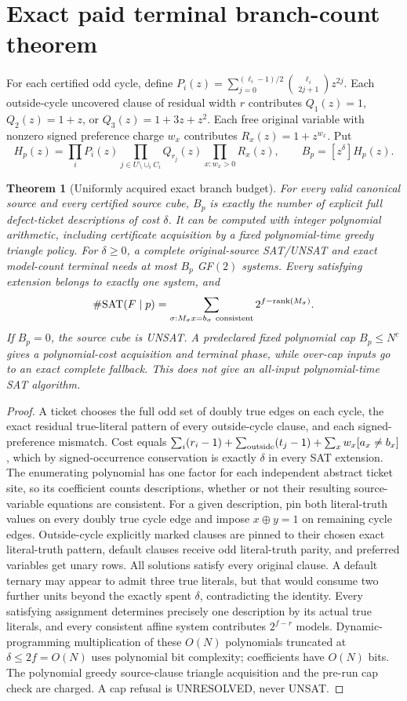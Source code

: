 \documentclass[11pt]{article}
\newtheorem{theorem}{Theorem}
\begin{document}
\section{Exact paid terminal branch-count theorem}
For each certified odd cycle, define $P_i(z)=\sum_{j=0}^{(\ell_i-1)/2}\binom{\ell_i}{2j+1}z^{2j}$. Each outside-cycle uncovered clause of residual width $r$ contributes $Q_1(z)=1$, $Q_2(z)=1+z$, or $Q_3(z)=1+3z+z^2$. Each free original variable with nonzero signed preference charge $w_x$ contributes $R_x(z)=1+z^{w_x}$. Put
\[
H_p(z)=\prod_iP_i(z)\prod_{j\in U\setminus\cup_i C_i}Q_{r_j}(z)
\prod_{x:w_x>0}R_x(z),\qquad
B_p=[z^\delta]H_p(z).
\]
\begin{theorem}[Uniformly acquired exact branch budget]
For every valid canonical source and every certified source cube, $B_p$ is exactly the number of explicit full defect-ticket descriptions of cost $\delta$. It can be computed with integer polynomial arithmetic, including certificate acquisition by a fixed polynomial-time greedy triangle policy. For $\delta\ge0$, a complete original-source SAT/UNSAT and exact model-count terminal needs at most $B_p$ GF$(2)$ systems. Every satisfying extension belongs to exactly one system, and
\[
\#\mathrm{SAT}(F\mid p)
=\sum_{\sigma: M_\sigma x=b_\sigma\ {\rm consistent}}
2^{f-\operatorname{rank}(M_\sigma)}.
\]
If $B_p=0$, the source cube is UNSAT. A predeclared fixed polynomial cap $B_p\le N^c$ gives a polynomial-cost acquisition and terminal phase, while over-cap inputs go to an exact complete fallback. This does not give an all-input polynomial-time SAT algorithm.
\end{theorem}
\begin{proof}
A ticket chooses the full odd set of doubly true edges on each cycle, the exact residual true-literal pattern of every outside-cycle clause, and each signed-preference mismatch. Cost equals $\sum_i(r_i-1)+\sum_{\rm outside}(t_j-1)+\sum_xw_x[a_x\ne b_x]$, which by signed-occurrence conservation is exactly $\delta$ in every SAT extension. The enumerating polynomial has one factor for each independent abstract ticket site, so its coefficient counts descriptions, whether or not their resulting source-variable equations are consistent. For a given description, pin both literal-truth values on every doubly true cycle edge and impose $x\oplus y=1$ on remaining cycle edges. Outside-cycle explicitly marked clauses are pinned to their chosen exact literal-truth pattern, default clauses receive odd literal-truth parity, and preferred variables get unary rows. All solutions satisfy every original clause. A default ternary may appear to admit three true literals, but that would consume two further units beyond the exactly spent $\delta$, contradicting the identity. Every satisfying assignment determines precisely one description by its actual true literals, and every consistent affine system contributes $2^{f-r}$ models. Dynamic-programming multiplication of these $O(N)$ polynomials truncated at $\delta\le2f=O(N)$ uses polynomial bit complexity; coefficients have $O(N)$ bits. The polynomial greedy source-clause triangle acquisition and the pre-run cap check are charged. A cap refusal is UNRESOLVED, never UNSAT.
\end{proof}
\end{document}
